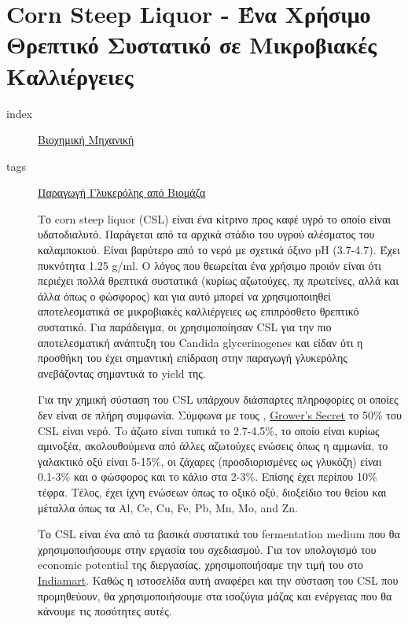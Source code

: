 \documentclass[11pt]{article}
\begin{document}
\section{Corn Steep Liquor - Ένα Χρήσιμο Θρεπτικό Συστατικό σε Μικροβιακές Καλλιέργειες}
\label{sec:orgb13a136}
\begin{description}
\item[{index}] \href{\detokenize{../../../../org_roam/βιοχημικη_μηχανικη-05-10-22.org}}{Βιοχημική Μηχανική}
\item[{tags}] \href{\detokenize{../../../../org_roam/παραγωγη_γλυκερολης_απο_βιομαζα-13-10-22.org}}{Παραγωγή Γλυκερόλης από Βιομάζα} 

Το corn steep liquor (CSL) είναι ένα κίτρινο προς καφέ υγρό το οποίο είναι υδατοδιαλυτό. Παράγεται από τα αρχικά στάδιο του υγρού αλέσματος του καλαμποκιού. Είναι βαρύτερο από το νερό με σχετικά όξινο pH (3.7-4.7). Έχει πυκνότητα 1.25 g/ml. Ο λόγος που θεωρείται ένα χρήσιμο προιόν είναι ότι περιέχει πολλά θρεπτικά συστατικά (κυρίως αζωτούχες, πχ πρωτείνες, αλλά και άλλα όπως ο φώσφορος) και για αυτό μπορεί να χρησιμοποιηθεί αποτελεσματικά σε μικροβιακές καλλιέργειες ως επιπρόσθετο θρεπτικό συστατικό. Για παράδειγμα, οι \cite{zhugeGlycerolProductionNovel2001,jinByproductFormationNovel2003} χρησιμοποίησαν CSL για την πιο αποτελεσματική ανάπτυξη του Candida glycerinogenes και είδαν ότι η προσθήκη του έχει σημαντική επίδραση στην παραγωγή γλυκερόλης ανεβάζοντας σημαντικά το yield της.

Για την χημική σύσταση του CSL υπάρχουν διάσπαρτες πληροφορίες οι οποίες δεν είναι σε πλήρη συμφωνία. Σύμφωνα με τους \cite{liggettCORNSTEEPLIQUOR}, \href{\detokenize{https://www.growerssecret.com/corn-steep-liquor-and-powder-fertilizers\#:\~:text=Chemical\%20Properties\%20of\%20Corn\%20Steep\%20Liquor\&text=Alanine\%20plays\%20a\%20role\%20in,3\%25\%20of\%20phosphorus\%20and\%20potassium.}}{Grower's Secret} το 50\% του CSL είναι νερό. To άζωτο είναι τυπικά το 2.7-4.5\%, το οποίο είναι κυρίως αμινοξέα, ακολουθούμενα από άλλες αζωτούχες ενώσεις όπως η αμμωνία, το γαλακτικό οξύ είναι 5-15\%, οι ζάχαρες (προσδιορισμένες ως γλυκόζη) είναι 0.1-3\% και ο φώσφορος και το κάλιο στα 2-3\%. Επίσης έχει περίπου 10\% τέφρα. Τέλος, έχει ίχνη ενώσεων όπως το οξικό οξύ, διοξείδιο του θείου και μέταλλα όπως τα Al, Ce, Cu, Fe, Pb, Mn, Mo, and Zn.

Το CSL είναι ένα από τα βασικά συστατικά του fermentation medium που θα χρησιμοποιήσουμε στην εργασία του σχεδιασμού. Για τον υπολογισμό του economic potential της διεργασίας, χρησιμοποιήσαμε την τιμή του στο \href{\detokenize{https://www.indiamart.com/proddetail/corn-steep-liquor-15744963191.html}}{Indiamart}. Καθώς η ιστοσελίδα αυτή αναφέρει και την σύσταση του CSL που προμηθεύουν, θα χρησιμοποιήσουμε στα ισοζύγια μάζας και ενέργειας που θα κάνουμε τις ποσότητες αυτές.


\end{description}
\end{document}
